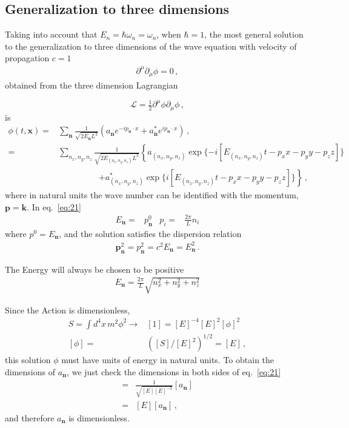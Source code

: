 \subsection{Generalization to three dimensions}
\label{sec:gener-three-dimens}
\begin{frame}
Taking into account that $E_n=\hbar\omega_n=\omega_n$, when $\hbar=1$, the most general solution to the generalization to three dimensions  of the wave equation with velocity of propagation $c=1$
\begin{align}
  \partial^\mu\partial_\mu\phi=0\,,
\end{align}
obtained from the three dimension Lagrangian 

\begin{equation}
  \mathcal{L}=\tfrac{1}{2}\partial^\mu\phi\partial_\mu\phi\,,
\end{equation}
is
\begin{align}
  \label{eq:21}
  \phi(t,\mathbf{x})=&\sum_\mathbf{n}\frac{1}{\sqrt{2E_\mathbf{n} L^3}}
  \left(a_\mathbf{n} e^{-i p_\mathbf{n}\cdot x }+a_\mathbf{n}^* e^{i p_\mathbf{n}\cdot x }\right)\,,\nonumber\\
 =&\sum_{n_x,n_y,n_z}\frac{1}{\sqrt{2E_{(n_x,n_y,n_z)} L^3}}
  \left\{a_{(n_x,n_y,n_z)} \exp\{ -i [E_{(n_x,n_y,n_z)}t-p_{x}x-p_{y}y-p_{z}z] \} \right.\nonumber\\
&\hspace{2cm}\left.+a_{(n_x,n_y,n_z)}^* \exp\{ i[ E_{(n_x,n_y,n_z)}t-p_{x}x-p_{y}y-p_{z}z] \} \right\}\,,
\end{align}
where in natural units the wave number can be identified with the momentum, $\mathbf{p}=\mathbf{k}$. In eq.~\eqref{eq:21}
\begin{align}
  E_{\mathbf{n}}=&p^0_{\mathbf{n}} & p_i=&\frac{2\pi}{L}n_i
\end{align}
where $p^0=E_\mathbf{n}$, and the solution satisfies the dispersion relation 
\begin{align}
  \mathbf{p}_{\mathbf{n}}^2=p_{\mathbf{n}}^2=c^2E_{\mathbf{n}}=E_{\mathbf{n}}^2\,.
\end{align}

The Energy will always be chosen to be positive
\begin{align}
  E_{\mathbf{n}}=\frac{2\pi}{L}\sqrt{n_x^2+n_y^2+n_z^2}
\end{align}

Since the Action is dimensionless, 
\begin{align}
  S=\int d^4x\, m^2\phi^2\to& [1]=[E]^{-4}[E]^2[\phi]^2\nonumber\\
  [\phi]=&([S]/[E]^{2})^{1/2}=[E]\,,
\end{align}
this solution $\phi$  must have units of energy in natural units.
To obtain the dimensions of $a_{\mathbf{n}}$, we just check the dimensions in both sides of eq.~\eqref{eq:21}
\begin{align}
  [E]=&\frac{1}{\sqrt{[E][E]^{-3}}}[a_{\mathbf{n}}]\nonumber\\
  =&[E][a_{\mathbf{n}}]\,,
\end{align}
and therefore  $a_{\mathbf{n}}$ is dimensionless.


\end{frame}
